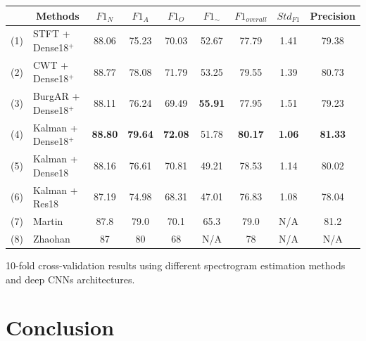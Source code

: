 \documentclass[portrait,a0,final]{a0poster} %
\newcommand{\sectionspace}{10mm} %
\newcommand{\figurespace}{10mm} %
\begin{document}
\begin{minipage}{0.98\linewidth}
\begin{minipage}[t]{0.47\linewidth}
\begin{minipage}[c]{\linewidth}
\large
\vspace{\figurespace}
\begin{tabular}{|l|l|c|c|c|c|c|c|c|}
	\hline
	& \multicolumn{1}{c|}{Methods}           & $F1_N$        & $F1_A$        & $F1_O$      & $F1_\sim$     & $F1_{overall}$  & $Std_{F1}$ & Precision \\ \hline
	(1) & STFT + Dense18$^+$                          & 88.06          & 75.23          & 70.03        & 52.67          & 77.79          & 1.41      & 79.38          \\ \hline
	(2) & CWT + Dense18$^+$                           & 88.77          & 78.08          & 71.79        & 53.25          & 79.55          & 1.39      & 80.73          \\ \hline
	(3) & BurgAR + Dense18$^+$                         & 88.11          & 76.24          & 69.49        & \textbf{55.91} & 77.95          & 1.51      & 79.23          \\ \hline
	(4) & Kalman + Dense18$^+$                        & \textbf{88.80} & \textbf{79.64} & \textbf{72.08}        & 51.78          & \textbf{80.17} & \textbf{1.06}      & \textbf{81.33} \\ \hline
	(5) & Kalman + Dense18                       & 88.16          & 76.61          & 70.81        & 49.21          & 78.53          & 1.14      & 80.02          \\ \hline
	(6) & Kalman + Res18\cite{he2016deep}                         & 87.19          & 74.98          & 68.31        & 47.01          & 76.83          & 1.08      & 78.04          \\ \hline
	(7) & Martin\cite{zihlmann2017convolutional} & 87.8            & 79.0            & 70.1 & 65.3   & 79.0            & N/A        & 81.2           \\ \hline
	(8) & Zhaohan\cite{xiong2017robust}                                & 87              & 80              & 68            & N/A             & 78              & N/A        & N/A             \\ \hline
\end{tabular}

\vspace{5mm}
10-fold cross-validation results using different spectrogram estimation methods and deep CNNs architectures.
\end{minipage}

\vspace{\sectionspace}
\section{Conclusion}




\end{minipage}
\end{minipage}
\end{document}
